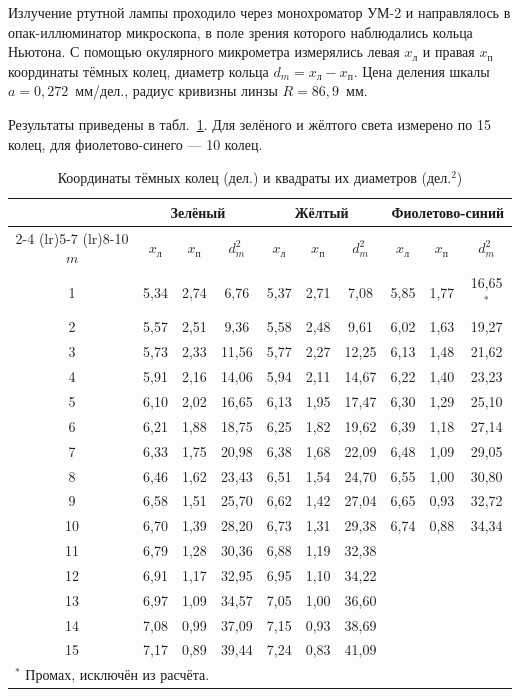 \documentclass[14pt,a4paper]{extarticle}
\begin{document}
Излучение ртутной лампы проходило через монохроматор УМ-2 и направлялось в опак-иллюминатор микроскопа, в поле зрения которого наблюдались кольца Ньютона. С помощью окулярного микрометра измерялись левая $x_{\text{л}}$ и правая $x_{\text{п}}$ координаты тёмных колец, диаметр кольца $d_m = x_{\text{л}} - x_{\text{п}}$. Цена деления шкалы $a = 0{,}272$~мм/дел., радиус кривизны линзы $R = 86{,}9$~мм.

Результаты приведены в табл.~\ref{tab:rings}. Для зелёного и жёлтого света измерено по 15 колец, для фиолетово-синего --- 10 колец.

\begin{table}[htbp]
\caption{Координаты тёмных колец (дел.) и квадраты их диаметров (дел.$^2$)}
\label{tab:rings}
\centering
\footnotesize
\setlength{\tabcolsep}{3.5pt}
\begin{tabular}{cccccccccc}
\toprule
& \multicolumn{3}{c}{Зелёный} & \multicolumn{3}{c}{Жёлтый} & \multicolumn{3}{c}{Фиолетово-синий} \\
\cmidrule(lr){2-4} \cmidrule(lr){5-7} \cmidrule(lr){8-10}
$m$ & $x_{\text{л}}$ & $x_{\text{п}}$ & $d_m^2$ & $x_{\text{л}}$ & $x_{\text{п}}$ & $d_m^2$ & $x_{\text{л}}$ & $x_{\text{п}}$ & $d_m^2$ \\
\midrule
1 & 5,34 & 2,74 & 6,76 & 5,37 & 2,71 & 7,08 & 5,85 & 1,77 & 16,65$^{*}$ \\
2 & 5,57 & 2,51 & 9,36 & 5,58 & 2,48 & 9,61 & 6,02 & 1,63 & 19,27 \\
3 & 5,73 & 2,33 & 11,56 & 5,77 & 2,27 & 12,25 & 6,13 & 1,48 & 21,62 \\
4 & 5,91 & 2,16 & 14,06 & 5,94 & 2,11 & 14,67 & 6,22 & 1,40 & 23,23 \\
5 & 6,10 & 2,02 & 16,65 & 6,13 & 1,95 & 17,47 & 6,30 & 1,29 & 25,10 \\
6 & 6,21 & 1,88 & 18,75 & 6,25 & 1,82 & 19,62 & 6,39 & 1,18 & 27,14 \\
7 & 6,33 & 1,75 & 20,98 & 6,38 & 1,68 & 22,09 & 6,48 & 1,09 & 29,05 \\
8 & 6,46 & 1,62 & 23,43 & 6,51 & 1,54 & 24,70 & 6,55 & 1,00 & 30,80 \\
9 & 6,58 & 1,51 & 25,70 & 6,62 & 1,42 & 27,04 & 6,65 & 0,93 & 32,72 \\
10 & 6,70 & 1,39 & 28,20 & 6,73 & 1,31 & 29,38 & 6,74 & 0,88 & 34,34 \\
11 & 6,79 & 1,28 & 30,36 & 6,88 & 1,19 & 32,38 & & & \\
12 & 6,91 & 1,17 & 32,95 & 6,95 & 1,10 & 34,22 & & & \\
13 & 6,97 & 1,09 & 34,57 & 7,05 & 1,00 & 36,60 & & & \\
14 & 7,08 & 0,99 & 37,09 & 7,15 & 0,93 & 38,69 & & & \\
15 & 7,17 & 0,89 & 39,44 & 7,24 & 0,83 & 41,09 & & & \\
\bottomrule
\multicolumn{10}{l}{$^{*}$ Промах, исключён из расчёта.}
\end{tabular}
\end{table}
\end{document}

